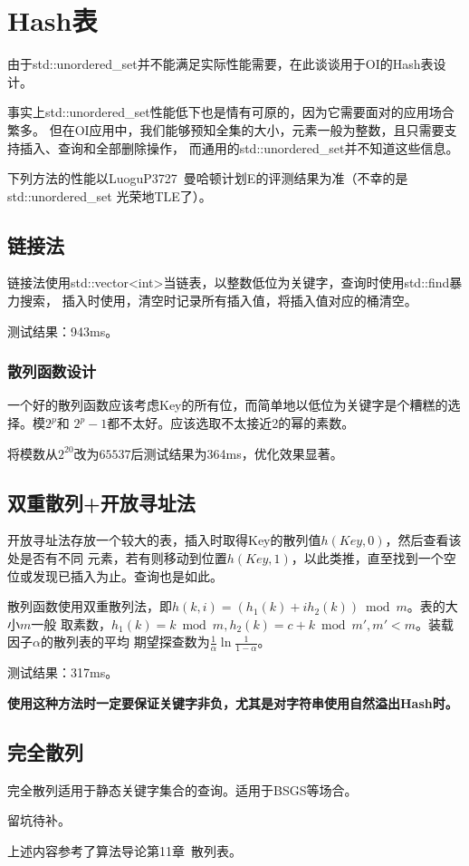 \section{Hash表}\label{HashTable}
由于std::unordered\_set并不能满足实际性能需要，在此谈谈用于OI的Hash表设计。

事实上std::unordered\_set性能低下也是情有可原的，因为它需要面对的应用场合繁多。
但在OI应用中，我们能够预知全集的大小，元素一般为整数，且只需要支持插入、查询和全部删除操作，
而通用的std::unordered\_set并不知道这些信息。

下列方法的性能以LuoguP3727~曼哈顿计划E的评测结果为准（不幸的是\\std::unordered\_set
光荣地TLE了）。

\subsection{链接法}
链接法使用std::vector<int>当链表，以整数低位为关键字，查询时使用std::find暴力搜索，
插入时使用，清空时记录所有插入值，将插入值对应的桶清空。

测试结果：943ms。
\subsubsection{散列函数设计}
一个好的散列函数应该考虑Key的所有位，而简单地以低位为关键字是个糟糕的选择。模$2^p$和
$2^p-1$都不太好。应该选取不太接近2的幂的素数。

将模数从$2^{20}$改为$65537$后测试结果为364ms，优化效果显著。
\subsection{双重散列+开放寻址法}
开放寻址法存放一个较大的表，插入时取得Key的散列值$h(Key,0)$，然后查看该处是否有不同
元素，若有则移动到位置$h(Key,1)$，以此类推，直至找到一个空位或发现已插入为止。查询也是如此。

散列函数使用双重散列法，即$h(k,i)=(h_1(k)+ih_2(k))\bmod m$。表的大小$m$一般
取素数，$h_1(k)=k\bmod m,h_2(k)=c+k \bmod m',m'<m$。装载因子$\alpha$的散列表的平均
期望探查数为$\frac{1}{\alpha}\ln \frac{1}{1-\alpha}$。

测试结果：317ms。


{\bfseries 使用这种方法时一定要保证关键字非负，尤其是对字符串使用自然溢出Hash时。}
\subsection{完全散列}
完全散列适用于静态关键字集合的查询。适用于BSGS等场合。

留坑待补。

上述内容参考了算法导论\cite{ITA3}第11章~散列表。
